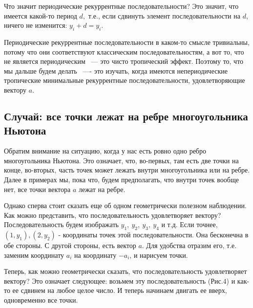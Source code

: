\documentclass[russian]{lecture-notes}
\begin{document}
Что значит периодические рекуррентные последовательности? Это значит, что имеется какой-то период $d,$ т.е., если сдвинуть элемент последовательности на $d$, ничего не изменится: $y_i+d=y_i$.

Периодические рекуррентные последовательности в каком-то смысле тривиальны, потому что они соответствуют классическим последовательностям, а вот то, что не является периодическим ~--- это чисто тропический эффект. Поэтому то, что мы
дальше будем делать ~---- это изучать, когда имеются непериодические тропические минимальные рекуррентные последовательности, удовлетворяющие вектору $a$.

\subsection{Случай: все точки лежат на ребре многоугольника Ньютона}

Обратим внимание на ситуацию, когда у нас есть ровно одно ребро многоугольника Ньютона. Это означает, что, во-первых, там есть две точки на конце, во-вторых, часть точек может лежать внутри многоугольника или на ребре. Далее в примерах мы, пока что, будем предполагать, что внутри точек вообще нет, все точки вектора $a$ лежат на ребре.


Однако сперва стоит сказать еще об одном геометрически полезном наблюдении. Как можно представить, что последовательность удовлетворяет вектору? Последовательность будем изображать $y_1,\: y_2,\: y_3,\: y_4$ и т.д. Если точнее, $(1,y_1),(2,y_2)$ - координаты точек этой последовательности. Она бесконечна в обе стороны. С другой стороны, есть вектор $a$. Для удобства отразим его, т.е. заменим координату $a_i$ на координату $-a_i$, и нарисуем точки.

Теперь, как можно геометрически сказать, что последовательность удовлетворяет вектору?  Это означает следующее: возьмем эту последовательность (Рис.4) и как-то ее сдвинем на любое целое число. И теперь начинаем двигать ее вверх, одновременно все точки.\\\\\\
\end{document}
